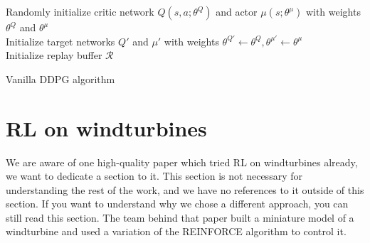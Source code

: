 \documentclass[hyperref,final,beleg]{cgvpub}
\begin{document}
\begin{algorithm}
\SetAlgoLined
Randomly initialize critic network $Q(s, a;\theta^Q)$ and actor $\mu(s;\theta^{\mu})$ with weights $\theta^Q$ and $\theta^{\mu}$\\
Initialize target networks $Q'$ and $\mu'$ with weights $\theta^{Q'} \leftarrow \theta^Q, \theta^{\mu'} \leftarrow \theta^{\mu}$\\
Initialize replay buffer $\mathcal{R}$\\

\caption{Vanilla DDPG algorithm}
\label{alg:vanilladdpg}
\end{algorithm}

\section{RL on windturbines}
We are aware of one high-quality paper \cite{kolterDesignAnalysisLearning2012} which tried RL on windturbines already, we want to dedicate a section to it. This section is not necessary for understanding the rest of the work, and we have no references to it outside of this section. If you want to understand why we chose a different approach, you can still read this section. The team behind that paper built a miniature model of a windturbine and used a variation of the \ac{REINFORCE} algorithm to control it.
\end{document}
